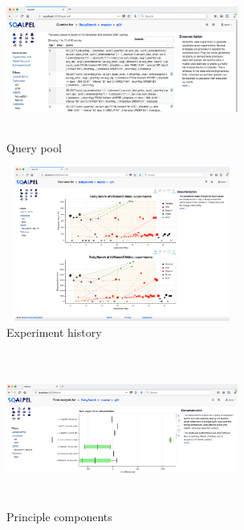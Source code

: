 \documentclass{cidr-2019}
\begin{document}
\begin{figure}[t!]
\centering
\includegraphics[height=2in,width=3in]{Figures/querypool2.png}
\caption{Query pool
	\label{fig:querypool2}}
\end{figure}

\begin{figure}[t!]
\centering
\includegraphics[height=2in,width=3in]{Figures/history2.png}
\caption{Experiment history
	\label{fig:history}}
\end{figure}

\begin{figure}[t!]
\centering
\includegraphics[height=2in,width=3in]{Figures/components2.png}
\caption{Principle components
	\label{fig:components}}
\end{figure}

\end{document}
